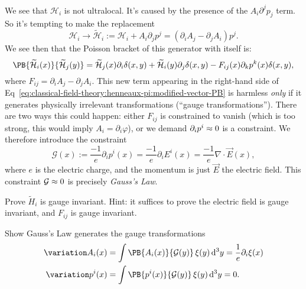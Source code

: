 We see that $\mathcal{H}_{i}$ is not ultralocal. It's caused by the
presence of the $A_{i}\partial^{j}p_{j}$ term. So it's tempting to make
the replacement
\begin{equation}
\mathcal{H}_{i}\to\widetilde{\mathcal{H}}_{i}
:=\mathcal{H}_{i} + A_{i}\partial_{j}p^{j}
=(\partial_{i}A_{j}-\partial_{j}A_{i})p^{j}.
\end{equation}
We see then that the Poisson bracket of this generator with itself is:
\begin{equation}\label{eq:classical-field-theory:henneaux-pi:modified-vector-PB}
\PB{\widetilde{\mathcal{H}}_{i}(x)}{\widetilde{\mathcal{H}}_{j}(y)}
= \widetilde{\mathcal{H}}_{j}(x)\partial_{i}\delta(x,y)
+ \widetilde{\mathcal{H}}_{i}(y)\partial_{j}\delta(x,y)
- F_{ij}(x)\partial_{k}p^{k}(x)\delta(x,y),
\end{equation}
where $F_{ij}=\partial_{i}A_{j}-\partial_{j}A_{i}$. This new term
appearing in the right-hand side of
Eq~\eqref{eq:classical-field-theory:henneaux-pi:modified-vector-PB} is
harmless \emph{only} if it generates physically irrelevant
transformations (``gauge transformations''). There are two ways this
could happen: either $F_{ij}$ is constrained to vanish (which is too
strong, this would imply $A_{i}=\partial_{i}\varphi$), or we demand
$\partial_{i}p^{i}\approx0$ is a constraint. We therefore introduce the
constraint
\begin{equation}
\mathcal{G}(x) := \frac{-1}{e}\partial_{i}p^{i}(x) =
\frac{-1}{e}\partial_{i}E^{i}(x) = \frac{-1}{e}\nabla\cdot\vec{E}(x),
\end{equation}
where $e$ is the electric charge, and the momentum is just $\vec{E}$ the
electric field. This constraint $\mathcal{G}\approx0$ is precisely
\emph{Gauss's Law}.

\begin{exercise}
Prove $\widetilde{H}_{i}$ is gauge invariant. Hint: it suffices to prove
the electric field is gauge invariant, and $F_{ij}$ is gauge invariant.
\end{exercise}

\begin{exercise}
Show Gauss's Law generates the gauge transformations
\begin{subequations}
\begin{align}
\variation A_{i}(x) &= \int\PB{A_{i}(x)}{\mathcal{G}(y)}\,\xi(y)\,\D^{3}y=\frac{1}{e}\partial_{i}\xi(x)\\
\variation p^{i}(x) &= \int\PB{p^{i}(x)}{\mathcal{G}(y)}\,\xi(y)\,\D^{3}y=0.
\end{align}
\end{subequations}
\end{exercise}

